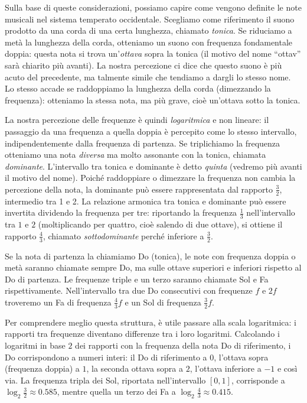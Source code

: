 Sulla base di queste considerazioni, possiamo capire come vengono definite 
le note musicali nel sistema temperato occidentale. 
Scegliamo come riferimento il suono prodotto da una corda di una certa lunghezza, 
chiamato \emph{tonica}. 
Se riduciamo a metà la lunghezza della corda, otteniamo un suono con frequenza fondamentale doppia: 
questa nota si trova un'\emph{ottava} sopra la tonica 
(il motivo del nome ``ottav'' sarà chiarito più avanti). 
La nostra percezione ci dice che questo suono è più acuto del precedente, 
ma talmente simile che tendiamo a dargli lo stesso nome. 
Lo stesso accade se raddoppiamo la lunghezza della corda (dimezzando la frequenza): 
otteniamo la stessa nota, ma più grave, cioè un’ottava sotto la tonica.

La nostra percezione delle frequenze è quindi \emph{logaritmica} e non lineare: 
il passaggio da una frequenza a quella doppia è percepito come lo stesso intervallo, 
indipendentemente dalla frequenza di partenza. 
Se triplichiamo la frequenza otteniamo una nota \emph{diversa} 
ma molto assonante con la tonica, chiamata \emph{dominante}. 
L’intervallo tra tonica e dominante è detto \emph{quinta} 
(vedremo più avanti il motivo del nome). 
Poiché raddoppiare o dimezzare la frequenza non cambia la percezione della nota, 
la dominante può essere rappresentata dal rapporto $\frac 3 2$, intermedio tra 1 e 2. 
La relazione armonica tra tonica e dominante può essere invertita dividendo la frequenza per tre: 
riportando la frequenza $\frac 1 3$ nell’intervallo tra $1$ e $2$ 
(moltiplicando per quattro, cioè salendo di due ottave), 
si ottiene il rapporto $\frac 4 3$, chiamato \emph{sottodominante} 
perché inferiore a $\frac 3 2$.


Se la nota di partenza la chiamiamo Do (tonica), 
le note con frequenza doppia o metà saranno chiamate sempre Do, 
ma sulle ottave superiori e inferiori rispetto al Do di partenza. 
Le frequenze triple e un terzo saranno chiamate Sol e Fa rispettivamente. 
Nell’intervallo tra due Do consecutivi con frequenze $f$ e $2f$ 
troveremo un Fa di frequenza $\frac 4 3 f$ e un Sol 
di frequenza $\frac 3 2 f$.

Per comprendere meglio questa struttura, è utile passare alla 
scala logaritmica: i rapporti tra frequenze 
diventano differenze tra i loro logaritmi. 
Calcolando i logaritmi in base $2$ dei rapporti 
con la frequenza della nota Do di riferimento, i Do 
corrispondono a numeri interi: il Do di riferimento a $0$, 
l’ottava sopra (frequenza doppia) a $1$, la seconda ottava sopra 
a $2$, l’ottava inferiore a $-1$ e così via. 
La frequenza tripla dei Sol, riportata nell’intervallo $[0,1]$, 
corrisponde a $\log_2\frac 3 2 \approx 0.585$, 
mentre quella un terzo dei Fa a $\log_2 \frac 4 3 \approx 0.415$.

